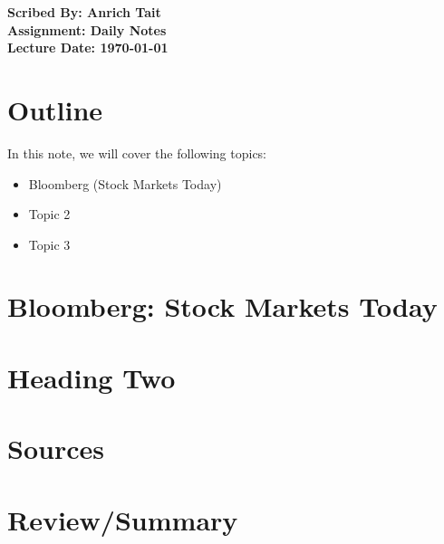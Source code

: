 \documentclass[11pt]{article}
\begin{document}
\noindent
\textbf{Scribed By: Anrich Tait} \\
\textbf{Assignment: Daily Notes} \\
\textbf{Lecture Date: \today}

\section*{Outline}
In this note, we will cover the following topics:
\begin{itemize}
    \item Bloomberg (Stock Markets Today)
    \item Topic 2
    \item Topic 3
\end{itemize}

\section{Bloomberg: Stock Markets Today}

\section{Heading Two}

\section{Sources}

\section{Review/Summary}
\end{document}
